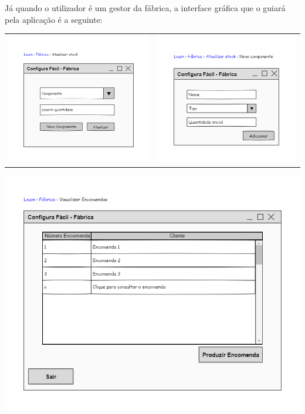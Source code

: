 \documentclass[11pt]{article} %
\begin{document}
Já quando o utilizador é um gestor da fábrica, a interface gráfica que o guiará pela aplicação é a seguinte:
\begin{center}
	\begin{table}[!htbp]
		\begin{tabular}{cc}
 			\includegraphics[width = 3in]{atualizar_stock.png} & \includegraphics[width = 3in]{nova_componente.png}
		\end{tabular}
	\end{table}

 	\includegraphics[width = 5.5in]{visualizar_encomendas.png}

\end{center}
\end{document}
